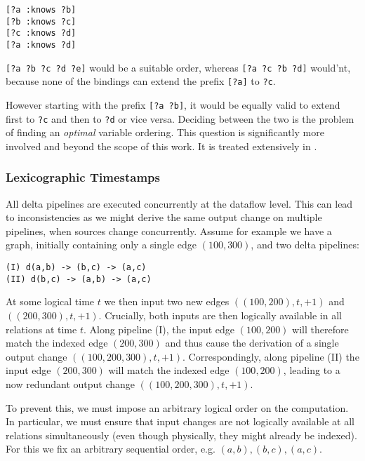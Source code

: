 \documentclass[../index.tex]{subfiles}
\begin{document}
\begin{lstlisting}[language=datalog, style=colorlog]
[?a :knows ?b]
[?b :knows ?c]
[?c :knows ?d]
[?a :knows ?d]
\end{lstlisting}

\texttt{[?a ?b ?c ?d ?e]} would be a suitable order, whereas
\texttt{[?a ?c ?b ?d]} would'nt, because none of the bindings can
extend the prefix \texttt{[?a]} to \texttt{?c}.

However starting with the prefix \texttt{[?a ?b]}, it would be equally
valid to extend first to \texttt{?c} and then to \texttt{?d} or vice
versa. Deciding between the two is the problem of finding an
\emph{optimal} variable ordering. This question is significantly more
involved and beyond the scope of this work. It is treated extensively
in \cite{abo2016faq}.

\subsubsection{Lexicographic Timestamps} \label{impl-altneu}

All delta pipelines are executed concurrently at the dataflow
level. This can lead to inconsistencies as we might derive the same
output change on multiple pipelines, when sources change
concurrently. Assume for example we have a graph, initially containing
only a single edge $(100,300)$, and two delta pipelines:

\begin{verbatim}
(I) d(a,b) -> (b,c) -> (a,c)
(II) d(b,c) -> (a,b) -> (a,c)
\end{verbatim}

At some logical time $t$ we then input two new edges
$((100,200),t,+1)$ and $((200,300),t,+1)$. Crucially, both inputs are
then logically available in all relations at time $t$. Along pipeline
(I), the input edge $(100,200)$ will therefore match the indexed edge
$(200,300)$ and thus cause the derivation of a single output change
$((100,200,300),t,+1)$. Correspondingly, along pipeline (II) the input
edge $(200,300)$ will match the indexed edge $(100,200)$, leading to a
now redundant output change $((100,200,300),t,+1)$.

To prevent this, we must impose an arbitrary logical order on the
computation. In particular, we must ensure that input changes are not
logically available at all relations simultaneously (even though
physically, they might already be indexed). For this we fix an
arbitrary sequential order, e.g. $(a,b),(b,c),(a,c)$.
\end{document}
